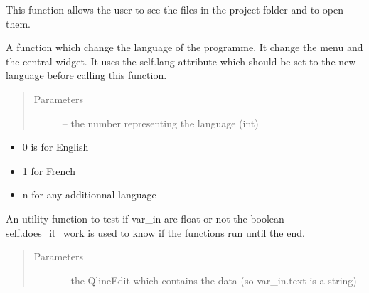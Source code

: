 \documentclass[letterpaper,10pt,english]{sphinxmanual}
\begin{document}
\begin{fulllineitems}
\begin{fulllineitems}
\end{fulllineitems}


\begin{fulllineitems}
\label{\detokenize{index:src_GUI.Main_windows_1.MainWindows.see_file}}
This function allows the user to see the files in the project folder and to open them.

\end{fulllineitems}


\begin{fulllineitems}
\label{\detokenize{index:src_GUI.Main_windows_1.MainWindows.setlangue}}
A function which change the language of the programme. It change the menu and the central widget.
It uses the self.lang attribute which should be set to the new language before calling this function.
\begin{quote}\begin{description}
\item[{Parameters}] \leavevmode
{} -- the number representing the language (int)

\end{description}\end{quote}
\begin{itemize}
\item {} 
0 is for English

\item {} 
1 for French

\item {} 
n for any additionnal language

\end{itemize}

\end{fulllineitems}


\begin{fulllineitems}
\label{\detokenize{index:src_GUI.Main_windows_1.MainWindows.test_entry_float}}
An utility function to test if var\_in are float or not
the boolean self.does\_it\_work is used to know if the functions run until the end.
\begin{quote}\begin{description}
\item[{Parameters}] \leavevmode
{} -- the QlineEdit which contains the data (so var\_in.text is a string)


\end{description}
\end{quote}
\end{fulllineitems}
\end{fulllineitems}
\end{document}
